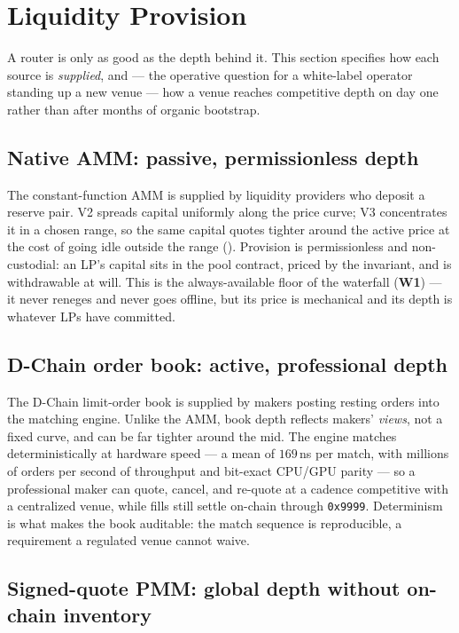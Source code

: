 \section{Liquidity Provision}
\label{sec:provision}

A router is only as good as the depth behind it. This section specifies how
each source is \emph{supplied}, and --- the operative question for a
white-label operator standing up a new venue --- how a venue reaches
competitive depth on day one rather than after months of organic bootstrap.

\subsection{Native AMM: passive, permissionless depth}

The constant-function AMM is supplied by liquidity providers who deposit a
reserve pair. V2 spreads capital uniformly along the price curve; V3
concentrates it in a chosen range, so the same capital quotes tighter
around the active price at the cost of going idle outside the range
(\cite{uniswapv3}). Provision is permissionless and non-custodial: an LP's
capital sits in the pool contract, priced by the invariant, and is
withdrawable at will. This is the always-available floor of the waterfall
(\textbf{W1}) --- it never reneges and never goes offline, but its price is
mechanical and its depth is whatever LPs have committed.

\subsection{D-Chain order book: active, professional depth}

The D-Chain limit-order book is supplied by makers posting resting orders
into the matching engine. Unlike the AMM, book depth reflects makers'
\emph{views}, not a fixed curve, and can be far tighter around the mid. The
engine matches deterministically at hardware speed --- a mean of $169$\,ns
per match, with millions of orders per second of throughput and bit-exact
CPU/GPU parity --- so a professional maker can quote, cancel, and re-quote
at a cadence competitive with a centralized venue, while fills still settle
on-chain through \texttt{0x9999}. Determinism is what makes the book
auditable: the match sequence is reproducible, a requirement a regulated
venue cannot waive.

\subsection{Signed-quote PMM: global depth without on-chain inventory}
\label{sec:provision-pmm}

